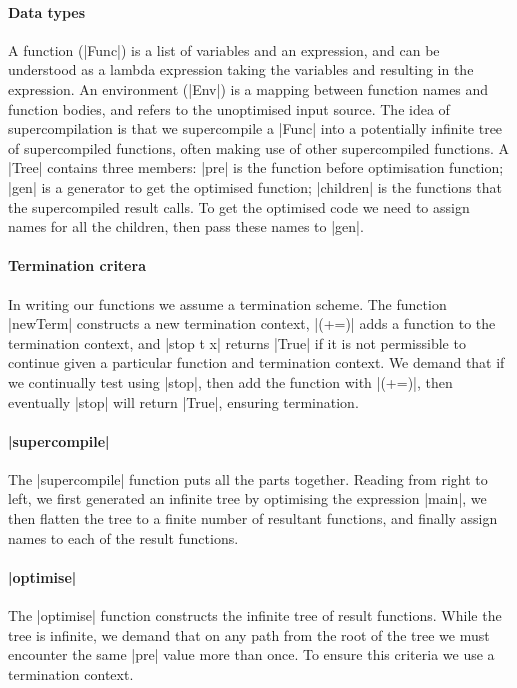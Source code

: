 \documentclass{sigplanconf}
\begin{document}
\paragraph{Data types} A function (|Func|) is a list of variables and an expression, and can be understood as a lambda expression taking the variables and resulting in the expression. An environment (|Env|) is a mapping between function names and function bodies, and refers to the unoptimised input source. The idea of supercompilation is that we supercompile a |Func| into a potentially infinite tree of supercompiled functions, often making use of other supercompiled functions. A |Tree| contains three members: |pre| is the function before optimisation function; |gen| is a generator to get the optimised function; |children| is the functions that the supercompiled result calls. To get the optimised code we need to assign names for all the children, then pass these names to |gen|.

\paragraph{Termination critera} In writing our functions we assume a termination scheme. The function |newTerm| constructs a new termination context, |(+=)| adds a function to the termination context, and |stop t x| returns |True| if it is not permissible to continue given a particular function and termination context. We demand that if we continually test using |stop|, then add the function with |(+=)|, then eventually |stop| will return |True|, ensuring termination.

\paragraph{|supercompile|} The |supercompile| function puts all the parts together. Reading from right to left, we first generated an infinite tree by optimising the expression |main|, we then flatten the tree to a finite number of resultant functions, and finally assign names to each of the result functions.

\paragraph{|optimise|} The |optimise| function constructs the infinite tree of result functions. While the tree is infinite, we demand that on any path from the root of the tree we must encounter the same |pre| value more than once. To ensure this criteria we use a termination context.
\end{document}
